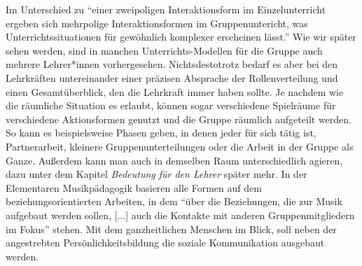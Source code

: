 Im Unterschied zu \enquote{einer zweipoligen Interaktionsform im
Einzelunterricht ergeben sich mehrpolige Interaktionsformen im Gruppenuntericht,
was Unterrichtssituationen für gewöhnlich komplexer erscheinen lässt.}
\autocite[30]{losert:die_kunst_zu_unterrichten} Wie wir später sehen werden,
sind in manchen Unterrichts-Modellen für die Gruppe auch mehrere Lehrer*innen
vorhergesehen. Nichtsdestotrotz bedarf es aber bei den Lehrkräften untereinander
einer präzisen Absprache der Rollenverteilung und einen Gesamtüberblick, den die
Lehrkraft immer haben sollte. Je nachdem wie die räumliche Situation es erlaubt,
können sogar verschiedene Spielräume für verschiedene Aktionsformen genutzt und
die Gruppe räumlich aufgeteilt werden. So kann es beispielsweise Phasen geben,
in denen jeder für sich tätig ist, Partnerarbeit, kleinere Gruppenunterteilungen
oder die Arbeit in der Gruppe als Ganze. Außerdem kann man auch in demselben
Raum unterschiedlich agieren, dazu unter dem Kapitel \emph{Bedeutung für den
Lehrer} später mehr. In der Elementaren Musikpädagogik basieren alle Formen auf
dem beziehungsorientierten Arbeiten, in dem \enquote{über die Beziehungen, die
zur Musik aufgebaut werden sollen, [...] auch die Kontakte mit anderen
Gruppenmitgliedern im Fokus} \autocite[10]{dartsch:kern_des_musizierens} stehen.
Mit dem ganzheitlichen Menschen im Blick, soll neben der angestrebten
Persönlichkeitsbildung die soziale Kommunikation ausgebaut werden.
